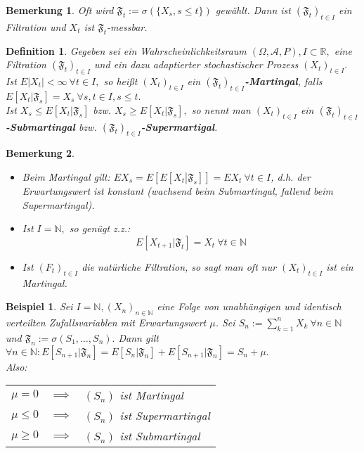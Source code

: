 \documentclass[a4paper,11pt]{book}
\newcommand{\R}{{\mathbb R}}
\newcommand{\N}{{\mathbb N}}
\def\AA{ \mathcal{A} }
\def\FF{ \mathfrak{F} }
\def\folgt{\ensuremath{\implies}}
\newtheorem*{DefON}{Definition}
\newtheorem{Bsp}{Beispiel}[chapter]
\newtheorem*{BemON}{Bemerkung}
\theoremstyle{nonumberplain}
\begin{document}
\begin{BemON} Oft wird $\FF_t := \sigma(\{X_s, s\le t\})$ gewählt. Dann ist $(\FF_t)_{t\in I}$ ein Filtration und $X_t$ ist $\FF_t$-messbar.
\end{BemON}

\begin{DefON}
Gegeben sei ein Wahrscheinlichkeitsraum $(\Omega, \AA, P), I\subset\R,$ eine Filtration $(\FF_t)_{t\in I}$ und ein dazu adaptierter stochastischer Prozess $(X_t)_{t\in I}.$ Ist $E|X_t|<\infty\ \forall t\in I,$ so heißt $(X_t)_{t\in I}$ ein \textbf{$(\FF_t)_{t\in I}$-Martingal}, falls $E[X_t|\FF_s] = X_s\ \forall s, t\in I, s\le t.$\\
Ist $X_s\le E[X_t|\FF_s]$ bzw. $X_s\ge E[X_t|\FF_s],$ so nennt man $(X_t)_{t\in I}$ ein \textbf{$(\FF_t)_{t\in I}$-Submartingal} bzw. \textbf{$(\FF_t)_{t\in I}$-Supermartigal}.
\end{DefON}

\begin{BemON}
\begin{itemize}
\item[a)] Beim Martingal gilt: $EX_s = E\left[E\left[X_t\left|\FF_s\right.\right]\right] = EX_t\ \forall t\in I$, d.h. der Erwartungswert ist konstant (wachsend beim Submartingal, fallend beim Supermartingal).
\item[b)] Ist $I = \N,$ so genügt z.z.:
$$E[X_{t+1}|\FF_t] = X_t\ \forall t\in\N$$
\item[c)] Ist $(F_t)_{t\in I}$ die natürliche Filtration, so sagt man oft nur $(X_t)_{t\in I}$ ist ein Martingal.
\end{itemize}
\end{BemON}

\begin{Bsp} \label{Bsp8.1}
Sei $I=\N, (X_n)_{n\in\N}$ eine Folge von unabhängigen und identisch verteilten Zufallsvariablen mit Erwartungswert $\mu$. Sei $S_n:=\sum_{k=1}^n X_k\ \forall n\in\N$ und $\FF_n:=\sigma(S_1,\ldots, S_n).$ Dann gilt $\forall n\in\N: E[S_{n+1}|\FF_n] = E[S_n|\FF_n] + E[S_{n+1}|\FF_n] = S_n + \mu.$\\
Also: \begin{tabular}[t]{rcp{}}
$\mu = 0$ & $\folgt$ & $(S_n)$ ist Martingal\\
$\mu \le 0$ & $\folgt$ & $(S_n)$ ist Supermartingal\\
$\mu \ge 0$ & $\folgt$ & $(S_n)$ ist Submartingal\\
\end{tabular}
\end{Bsp}
\end{document}

